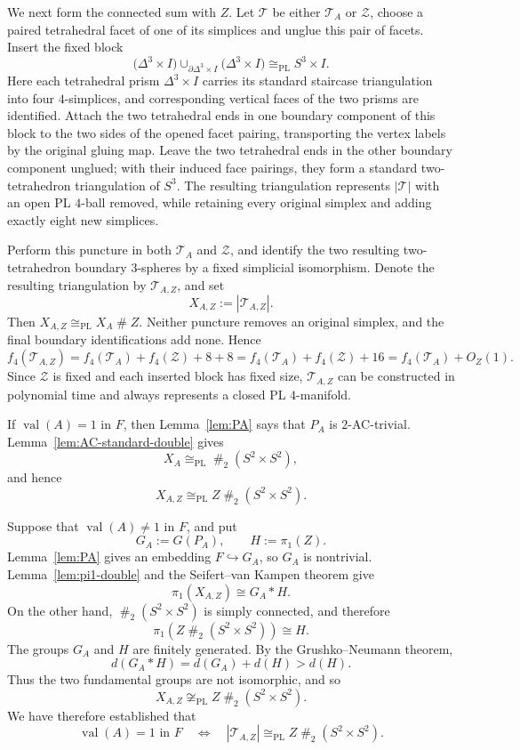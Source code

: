 \documentclass[a4paper,11pt,reqno]{amsart}
\theoremstyle{definition}
\theoremstyle{remark}
\DeclareMathOperator{\val}{val}
\newcommand{\PL}{\mathrm{PL}}
\newcommand{\cs}{\mathbin{\#}}
\begin{document}
	We next form the connected sum with $Z$.
	Let $\mathcal T$ be either $\mathcal T_A$ or
	$\mathcal Z$, choose a paired tetrahedral facet of one of its
	simplices and unglue this pair of facets. Insert the fixed block
	\[
	\bigl(\Delta^3\times I\bigr)
	\mathbin{\cup}_{\partial\Delta^3\times I}
	\bigl(\Delta^3\times I\bigr)
	\cong_{\PL}S^3\times I.
	\]
	Here each tetrahedral prism $\Delta^3\times I$ carries its standard
	staircase triangulation into four $4$-simplices, and corresponding vertical
	faces of the two prisms are identified. Attach the two tetrahedral ends in
	one boundary component of this block to the two sides of the opened facet
	pairing, transporting the vertex labels by the original gluing map. Leave
	the two tetrahedral ends in the other boundary component unglued; with
	their induced face pairings, they form a standard two-tetrahedron
	triangulation of $S^3$. 
	The resulting triangulation represents $|\mathcal T|$ with an open PL $4$-ball removed, while retaining every original simplex and adding exactly eight new simplices.
	
	Perform this puncture in both $\mathcal T_A$ and $\mathcal Z$, and
	identify the two resulting two-tetrahedron boundary $3$-spheres by a
	fixed simplicial isomorphism. Denote the resulting
	triangulation by $\mathcal T_{A,Z}$, and set
	\[
	X_{A,Z}:=|\mathcal T_{A,Z}|.
	\]
	Then
	\(
	X_{A,Z}\cong_{\PL}X_A\cs Z.
	\)
	Neither puncture removes an original simplex, and the final boundary
	identifications add none. Hence
	\[
	f_4(\mathcal T_{A,Z})
	=f_4(\mathcal T_A)+f_4(\mathcal Z)+8+8
	=f_4(\mathcal T_A)+f_4(\mathcal Z)+16
	=f_4(\mathcal T_A)+O_Z(1).
	\]
	Since $\mathcal Z$ is fixed and each inserted block has fixed size,
	$\mathcal T_{A,Z}$ can be constructed in polynomial time and always
	represents a closed PL $4$-manifold.
	
	If $\val(A)=1$ in $F$, then Lemma~\ref{lem:PA} says that $P_A$ is
	$2$-AC-trivial. Lemma~\ref{lem:AC-standard-double} gives
	\[
	X_A\cong_{\PL}\cs_{2}(S^2\times S^2),
	\]
	and hence
	\[
	X_{A,Z}\cong_{\PL}Z\cs_{2}(S^2\times S^2).
	\]
	
	Suppose that $\val(A)\neq1$ in $F$, and put
	\[
	G_A:=G(P_A),
	\qquad
	H:=\pi_1(Z).
	\]
	Lemma~\ref{lem:PA} gives an embedding $F\hookrightarrow G_A$, so
	$G_A$ is nontrivial. Lemma~\ref{lem:pi1-double} and the
	Seifert--van Kampen theorem give
	\[
	\pi_1(X_{A,Z})\cong G_A*H.
	\]
	On the other hand, $\cs_2(S^2\times S^2)$ is simply connected, and
	therefore
	\[
	\pi_1\left(Z\cs_2(S^2\times S^2)\right)\cong H.
	\]
	The groups $G_A$ and $H$ are finitely generated. By the
	Grushko--Neumann theorem,
	\[
	d(G_A*H)=d(G_A)+d(H)>d(H).
	\]
	Thus the two fundamental groups are not isomorphic, and so
	\[
	X_{A,Z}\not\cong_{\PL}
	Z\cs_2(S^2\times S^2).
	\]
	We have therefore established that 
	\[
	\val(A)=1\text{ in }F
	\quad\Longleftrightarrow\quad
	|\mathcal T_{A,Z}|\cong_{\PL}
	Z\cs_2(S^2\times S^2).
	\]
	
\end{document}
